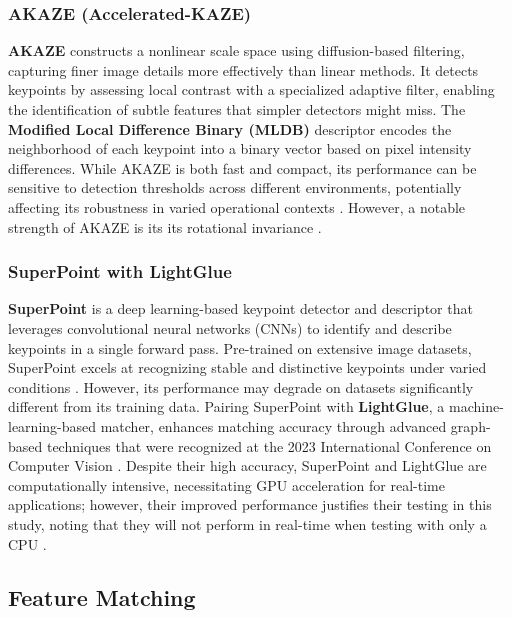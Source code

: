 \subsubsection{AKAZE (Accelerated-KAZE)}

\textbf{AKAZE} constructs a nonlinear scale space using diffusion-based filtering, capturing finer image details more effectively than linear methods. It detects keypoints by assessing local contrast with a specialized adaptive filter, enabling the identification of subtle features that simpler detectors might miss. The \textbf{Modified Local Difference Binary (MLDB)} \cite{reddy2021implementation} descriptor encodes the neighborhood of each keypoint into a binary vector based on pixel intensity differences. While AKAZE is both fast and compact, its performance can be sensitive to detection thresholds across different environments, potentially affecting its robustness in varied operational contexts \cite{opencv_akaze}. However, a notable strength of AKAZE is its its rotational invariance \cite{tareen2018comparative}. 

\subsubsection{SuperPoint with LightGlue}

\textbf{SuperPoint} is a deep learning-based keypoint detector and descriptor that leverages convolutional neural networks (CNNs) to identify and describe keypoints in a single forward pass. Pre-trained on extensive image datasets, SuperPoint excels at recognizing stable and distinctive keypoints under varied conditions \cite{rpaultrat2023superpoint}. However, its performance may degrade on datasets significantly different from its training data. Pairing SuperPoint with \textbf{LightGlue}, a machine-learning-based matcher, enhances matching accuracy through advanced graph-based techniques that were recognized at the 2023 International Conference on Computer Vision \cite{cvg2023lightglue}. Despite their high accuracy, SuperPoint and LightGlue are computationally intensive, necessitating GPU acceleration for real-time applications; however, their improved performance justifies their testing in this study, noting that they will not perform in real-time when testing with only a CPU \cite{rpaultrat2023superpoint}.



\subsection{Feature Matching}


